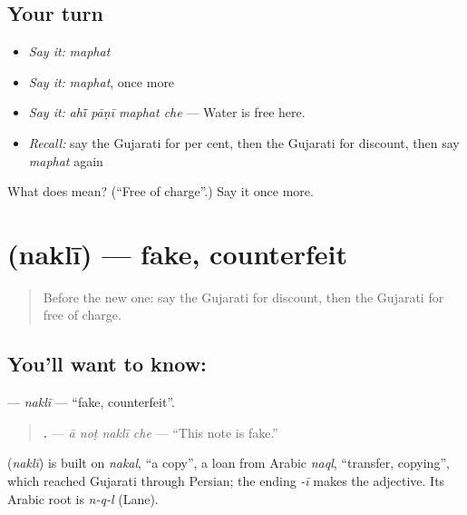 \subsection*{Your turn}
\begin{itemize}
\raggedright
  \item \emph{Say it:} \emph{maphat}
  \item \emph{Say it:} \emph{maphat}, once more
  \item \emph{Say it:} \emph{ahī̃ pāṇī maphat che} — Water is free here.
  \item \emph{Recall:} say the Gujarati for per cent, then the Gujarati for discount, then say \emph{maphat} again
\end{itemize}

\begin{tcolorbox}[breakable,colback=teal!4,colframe=teal!35!black,title={Before you move on}]
What does  mean? (\textquotedblleft{}Free of charge\textquotedblright{}.) Say it once more.
\end{tcolorbox}
\section[\texorpdfstring{\gu{નકલી} (naklī)}{નકલી (naklī)}]{ (naklī) — fake, counterfeit}

\label{lesson:GU-C188-nakli}



\begin{quote}
Before the new one: say the Gujarati for discount, then the Gujarati for free of charge.
\end{quote}

\subsection*{You'll want to know: }
\textbf{} — \emph{naklī} — \textquotedblleft{}fake, counterfeit\textquotedblright{}.

\begin{quote}
\textbf{   .} — \emph{ā noṭ naklī che} — \textquotedblleft{}This note is fake.\textquotedblright{}
\end{quote}

\begin{cousinweb}
\textbf{} (\emph{naklī}) is built on \emph{nakal}, \textquotedblleft{}a copy\textquotedblright{}, a loan from Arabic \emph{naql}, \textquotedblleft{}transfer, copying\textquotedblright{}, which reached Gujarati through Persian; the ending \emph{-ī} makes the adjective. Its Arabic root is \emph{n-q-l} (Lane).
\end{cousinweb}

